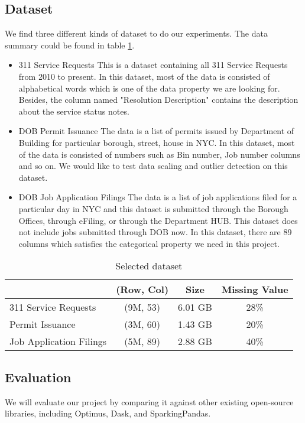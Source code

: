 \documentclass[sigconf]{acmart}
\begin{document}
\subsection{Dataset}
We find three different kinds of dataset to do our experiments. The data summary could be found in table \ref{tab:dataset}.
\begin{itemize}
	\item{311 Service Requests}\cite{nycopendata1} This is a dataset containing all 311 Service Requests from 2010 to present. In this dataset, most of the data is consisted of alphabetical words which is one of the data property we are looking for. Besides, the column named "Resolution Description" contains the description about the service status notes.
	\item{DOB Permit Issuance}\cite{nycopendata2} The data is a list of permits issued by Department of Building for particular borough, street, house in NYC. In this dataset, most of the data is consisted of numbers such as Bin number, Job number columns and so on. We would like to test data scaling and outlier detection on this dataset.
	\item{DOB Job Application Filings}\cite{nycopendata3} The data is a list of job applications filed for a particular day in NYC and this dataset is submitted through the Borough Offices, through eFiling, or through the Department HUB. This dataset does not include jobs submitted through DOB now. In this dataset, there are 89 columns which satisfies the categorical property we need in this project.
\end{itemize}

\begin{table}
\caption{Selected dataset}   
\label{tab:dataset}
\begin{tabular}{lccc}   
 		                 & (Row, Col)  & Size      & Missing Value  \\  
\hline
 311 Service Requests   & (9M, 53)     & 6.01 GB  & 28\%            \\ 
 Permit Issuance            & (3M, 60)     & 1.43 GB  & 20\%             \\  
 Job Application Filings   & (5M, 89)     & 2.88 GB  & 40\%             \\ 


\end{tabular}   
\end{table}

\subsection{Evaluation}
We will evaluate our project by comparing it against other existing open-source libraries, including Optimus\cite{optimus}, Dask\cite{dask}, and SparkingPandas\cite{sparklingpandas}. 
\end{document}
